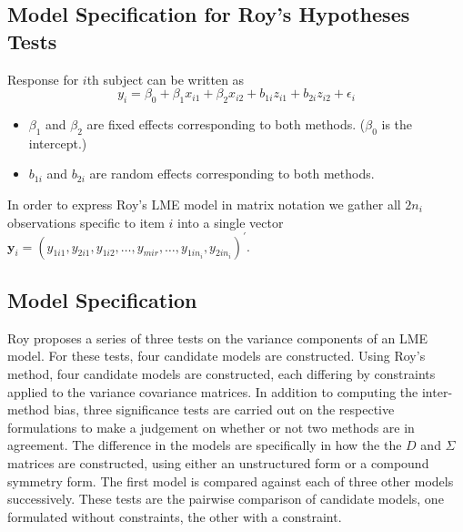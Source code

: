 \documentclass[12pt, a4paper]{report}
\theoremstyle{plain}
\theoremstyle{definition}
\theoremstyle{remark}
\begin{document}

	\subsection{Model Specification for Roy's Hypotheses Tests}
	
	Response for $i$th subject can be written as
	\[ y_i = \beta_0 + \beta_1x_{i1} + \beta_2x_{i2} + b_{1i}z_{i1}  + b_{2i}z_{i2} + \epsilon_i \]
	\begin{itemize}
		\item $\beta_1$ and $\beta_2$ are fixed effects corresponding to both methods. ($\beta_0$ is the intercept.)
		\item $b_{1i}$ and $b_{2i}$ are random effects corresponding to both methods.
	\end{itemize}
	
In order to express Roy's LME model in matrix notation we gather all $2n_i$ observations specific to item $i$ into a single vector  $\boldsymbol{y}_{i} = (y_{1i1},y_{2i1},y_{1i2},\ldots,y_{mir},\ldots,y_{1in_{i}},y_{2in_{i}})^\prime.$ 
	
	
\subsection{Model Specification}
Roy proposes a series of three tests on the variance components of an LME model. For these tests, four candidate models are constructed. Using Roy's method, four candidate models are constructed, each differing by constraints applied to the variance covariance matrices. In addition to computing the inter-method bias, three significance tests are carried out on the respective formulations to make a judgement on whether or not two methods are in agreement. The difference in the models are specifically in how the the $D$ and $\Sigma$ matrices are constructed, using either an unstructured form or a compound symmetry form. The first model is compared against each of three other models successively.	These tests are the pairwise comparison of candidate models, one formulated without constraints, the other with a constraint.
	
\end{document}
